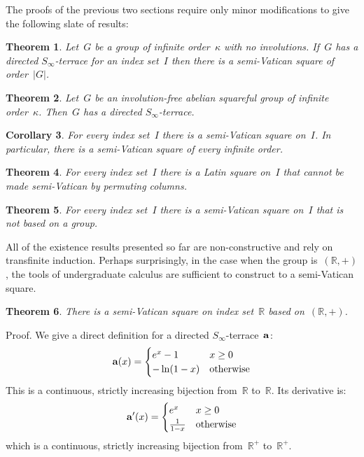 \documentclass[12pt,a4paper]{article}
\newtheorem{thm}{Theorem}[section]
\newtheorem{cor}[thm]{Corollary}
\newcommand{\R}{\mathbb{R}}
\begin{document}
The proofs of the previous two sections require only minor modifications to give the following slate of results:

\begin{thm}\label{th:semi_terrace2square}
Let~$G$ be a group of infinite order~$\kappa$ with no involutions.  If~$G$ has a directed $S_{\infty}$-terrace for an index set~$I$ then there is a semi-Vatican square of order~$|G|$.
\end{thm}

\begin{thm}\label{th:semi_T_infty}
Let~$G$ be an involution-free abelian squareful group of infinite order~$\kappa$.   Then~$G$ has a directed $S_{\infty}$-terrace.
\end{thm}

\begin{cor}\label{cor:semi_vatsquares}
For every index set~$I$ there is a semi-Vatican square on~$I$.  In particular, there is a semi-Vatican square of every infinite order.
\end{cor}

\begin{thm}\label{th:semi_notrcls}
For every index set~$I$ 
there is a Latin square on~$I$ that cannot be made semi-Vatican by permuting columns.
\end{thm}

\begin{thm}\label{th:semi_infvat}
For every index set~$I$ there is a semi-Vatican square on~$I$ that is not based on a  group.
\end{thm}

All of the existence results presented so far are non-constructive and rely on transfinite induction.  Perhaps surprisingly, in the case when the group is~$(\R, +)$, the tools of undergraduate calculus are sufficient to construct to a semi-Vatican square.


\begin{thm}\label{th:svr}
There is a semi-Vatican square on index set~$\R$ based on~$(\R,+)$.
\end{thm} 

\noindent
Proof.   We give a direct definition for a directed $S_{\infty}$-terrace~${\bf a}$:
\begin{equation*}
    {\bf a}(x) = \begin{cases}
               e^x   -1            & x \geq 0\\
               -\ln (1-x)       & \text{otherwise}
           \end{cases}
\end{equation*}
This is a continuous, strictly increasing bijection from~$\R$ to~$\R$.  Its derivative is:
\begin{equation*}
    {\bf a}'(x) = \begin{cases}
               e^x               & x \geq 0\\
              \frac{1}{1-x}       & \text{otherwise}
           \end{cases}
\end{equation*}
which is a continuous, strictly increasing bijection from~$\R^+$ to~$\R^+$.
\end{document}
